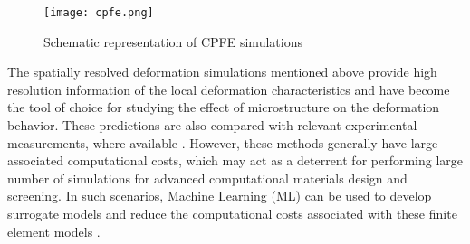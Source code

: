 \begin{figure}[!h]
	\centering
	\texttt{[image: cpfe.png]}
	\hspace{1mm}
	\caption{Schematic representation of CPFE simulations \cite{ROTERS20101152}}  
	\label{fig:cpfe}
\end{figure}

The spatially resolved deformation simulations mentioned above provide high resolution information of the local deformation characteristics and have become the tool of choice for studying the effect of microstructure on the deformation behavior. These predictions are also compared with relevant experimental measurements, where available \cite{POKHAREL2019201} \cite{THOOL2020102785} \cite{Radhakrishnan_2000}. However, these methods generally have large associated computational costs, which may act as a deterrent for performing large number of simulations for advanced computational materials design and screening. In such scenarios, Machine Learning (ML) can be used to develop surrogate models and reduce the computational costs associated with these finite element models \cite{pandey2020machine} \cite{muhammad2020machine} \cite{shen2019convolutional} \cite{MANGAL2018122}.

